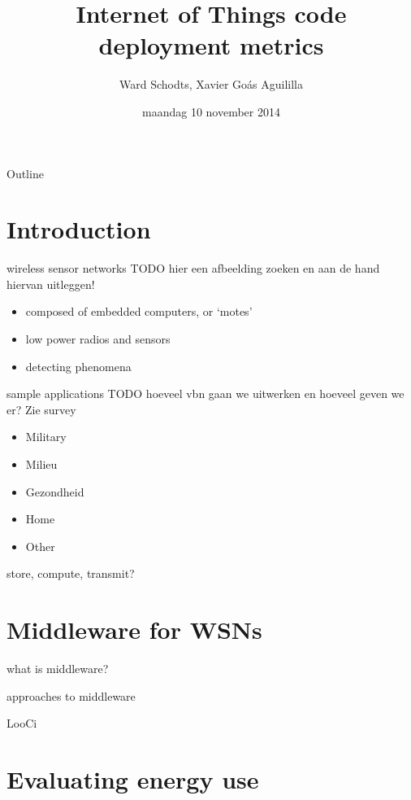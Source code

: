 \documentclass[presentation]{beamer}
\author{Ward Schodts, Xavier Goás Aguililla}
\date{maandag 10 november 2014}
\title{Internet of Things code deployment metrics}
\begin{document}
\maketitle
\begin{frame}{Outline}
\tableofcontents
\end{frame}


\section{Introduction}
\label{sec-1}
\begin{frame}[label=sec-1-1]{wireless sensor networks}
TODO hier een afbeelding zoeken en aan de hand hiervan uitleggen!
\begin{itemize}

\item composed of embedded computers, or ‘motes’
\item low power radios and sensors 
\item detecting phenomena
\end{itemize}
\end{frame}
\begin{frame}[label=sec-1-2]{sample applications}
TODO hoeveel vbn gaan we uitwerken en hoeveel geven we er? Zie survey
\begin{itemize}
\item Military
\item Milieu
\item Gezondheid
\item Home
\item Other
\end{itemize}
\end{frame}
\begin{frame}[label=sec-1-3]{store, compute, transmit?}
\end{frame}
\section{Middleware for WSNs}
\label{sec-2}
\begin{frame}[label=sec-2-1]{what is middleware?}
\end{frame}
\begin{frame}[label=sec-2-2]{approaches to middleware}
\end{frame}
\begin{frame}[label=sec-2-3]{LooCi}
\end{frame}
\section{Evaluating energy use}
\label{sec-3}
\end{document}
